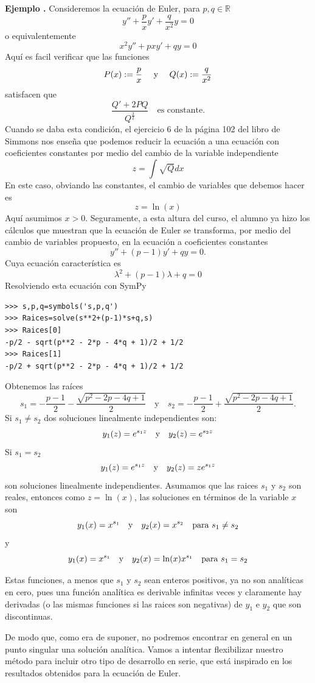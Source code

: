 \documentclass{article}
\newcounter{ejem_cont}
\newenvironment{ejemplo}[1]{\refstepcounter{ejem_cont}\vspace{1ex}\noindent\textbf{Ejemplo \arabic{ejem_cont}.} #1}{}
\newcounter{ejer_cont}
\newcommand{\rr}{\mathbb{R}}
\begin{document}
\begin{ejemplo} Consideremos la ecuación de Euler, para $p,q\in\rr$
\[y''+\frac{p}{x}y'+\frac{q}{x^2}y=0\]
o equivalentemente
\[x^2y''+pxy'+qy=0\]
Aquí es facil verificar que las funciones
\[P(x):=\frac{p}{x}\quad\hbox{ y }\quad Q(x):= \frac{q}{x^2}\]
satisfacen que
\[\frac{Q'+2PQ}{Q^{\frac{3}{2}}}\quad\text{es constante.}\]
 Cuando se daba esta condición, el ejercicio 6 de la página 102 del libro de Simmons nos enseña que podemos reducir la ecuación a una ecuación con coeficientes constantes por medio del cambio de la variable independiente
\[z=\int\sqrt{Q}dx\]
En este caso, obviando las constantes, el cambio de variables que debemos hacer es
\[z=\ln(x)\]
Aquí  asumimos $x>0$. Seguramente, a esta altura del curso,  el alumno ya hizo los cálculos que muestran que la ecuación de Euler se transforma,  por medio del cambio de variables propuesto, en la ecuación a coeficientes constantes
\[y''+(p-1)y'+qy=0.\]
Cuya ecuación característica es
\[\lambda^2+(p-1)\lambda+q=0\]
Resolviendo esta ecuación con SymPy

\begin{lstlisting}
>>> s,p,q=symbols('s,p,q')
>>> Raices=solve(s**2+(p-1)*s+q,s)
>>> Raices[0]
-p/2 - sqrt(p**2 - 2*p - 4*q + 1)/2 + 1/2
>>> Raices[1]
-p/2 + sqrt(p**2 - 2*p - 4*q + 1)/2 + 1/2
\end{lstlisting}
Obtenemos las raíces 
\[s_1= -\frac{p-1}{2} - \frac{\sqrt{p^2 - 2p - 4q + 1}}{2}   \quad\text{y}\quad s_2=-\frac{p-1}{2} +\frac{\sqrt{p^2 - 2p - 4q + 1}}{2} .\]
 Si $s_1\neq s_2$ dos soluciones linealmente independientes son:
\[y_1(z)=e^{s_1z}\quad\hbox{y}\quad y_2(z)=e^{s_2z}\]
 Si $s_1=s_2$
\[y_1(z)=e^{s_1z} \quad\hbox{y}\quad y_2(z)=ze^{s_1z}\]
son soluciones linealmente independientes. Asumamos que las raices $s_1$ y $s_2$ son reales, entonces como $z=\ln(x)$, las soluciones en términos de la variable $x$ son 
\[y_1(x)=x^{s_1}\quad\hbox{y}\quad y_2(x)=x^{s_2}\quad\text{para }  s_1\neq s_2\]
y
\[y_1(x)=x^{s_1} \quad\hbox{y}\quad y_2(x)=\ln(x)x^{s_1}\quad\text{para }  s_1= s_2\]



Estas funciones, a menos que $s_1$ y $s_2$ sean enteros positivos, ya no son analíticas en cero, pues una función analítica es derivable infinitas veces y claramente hay derivadas (o las mismas funciones si las raices son negativas) de $y_1$ e $y_2$ que son discontinuas. 
\end{ejemplo}


De modo que, como era de suponer, no podremos encontrar en general en un punto singular una solución analítica.  Vamos a intentar flexibilizar nuestro método para incluir otro tipo de desarrollo en serie, que está inspirado en los resultados obtenidos para la ecuación de Euler. 
\end{document}
